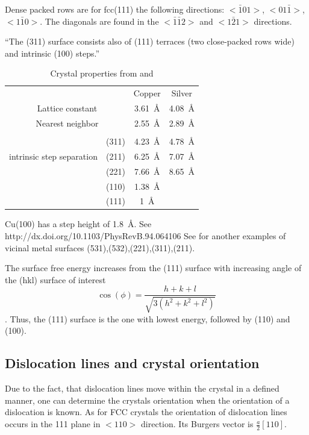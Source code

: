 Dense packed rows are for fcc(111) the following directions: $<\bar 1 01>$, $<01\bar 1>$, $<1\bar 1 0>$. The diagonals are found in the $<\bar 1 \bar 1 2>$ and $<1\bar 2 1>$ directions.

``The (311) surface consists also of (111) terraces (two close-packed rows wide) and intrinsic (100) steps.''

\begin{table}\label{tab:crystal-prop}
\caption{Crystal properties from \cite[29ff]{riemann_ionic_2002} and \cite{liu_oxygen_2014}}
\centering
\begin{tabular}{cccc}
			&				& Copper 	 & Silver \\
\multicolumn{2}{c}{Lattice constant}			& \SI{3.61}{\angstrom} & \SI{4.08}{\angstrom} \\
\multicolumn{2}{c}{Nearest neighbor}			& \SI{2.55}{\angstrom} & \SI{2.89}{\angstrom} \\ \hline \\
\multirow{3}{*}{intrinsic step separation}	& (311) & \SI{4.23}{\angstrom} & \SI{4.78}{\angstrom} \\
						& (211) & \SI{6.25}{\angstrom} & \SI{7.07}{\angstrom} \\
						& (221) & \SI{7.66}{\angstrom} & \SI{8.65}{\angstrom} \\
						& (110) & \SI{1.38}{\angstrom} & \\
						& (111) & \SI{1}{\angstrom} & \\
\end{tabular}
\end{table}
Cu(100) has a step height of \SI{1.8}{\angstrom}. See http://dx.doi.org/10.1103/PhysRevB.94.064106
See \cite{riemann_ionic_2002} for another examples of vicinal metal surfaces (531),(532),(221),(311),(211).

The surface free energy increases from the (111) surface with increasing angle of the (hkl) surface of interest $$\cos(\phi)=\frac{h+k+l}{\sqrt{3(h^2+k^2+l^2)}}$$ \cite{jian-min_calculation_2004}. Thus, the (111) surface is the one with lowest energy, followed by (110) and (100).

\subsection{Dislocation lines and crystal orientation}
Due to the fact, that dislocation lines move within the crystal in a defined manner, one can determine the crystals orientation when the orientation of a dislocation is known.
As for FCC crystals the orientation of dislocation lines occurs in the {111} plane in $<110>$ direction. Its Burgers vector is $\frac{a}{2}[110]$\cite{_dislocation-theory}.